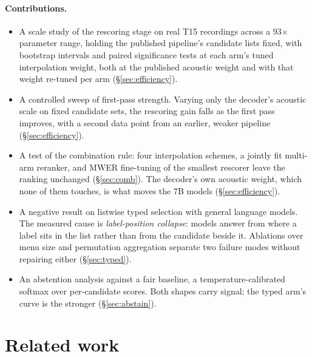 \documentclass[11pt]{article}
\begin{document}
\paragraph{Contributions.}
\begin{itemize}\itemsep2pt
\item A scale study of the rescoring stage on real T15 recordings across a 93$\times$
  parameter range, holding the published pipeline's candidate lists fixed, with bootstrap
  intervals and paired significance tests at each arm's tuned interpolation weight, both at
  the published acoustic weight and with that weight re-tuned per arm
  (\S\ref{sec:efficiency}).
\item A controlled sweep of first-pass strength. Varying only the decoder's acoustic
  scale on fixed candidate sets, the rescoring gain falls as the first pass improves, with
  a second data point from an earlier, weaker pipeline (\S\ref{sec:efficiency}).
\item A test of the combination rule: four interpolation schemes, a jointly fit multi-arm
  reranker, and MWER fine-tuning of the smallest rescorer leave the ranking unchanged
  (\S\ref{sec:comb}). The decoder's own acoustic weight, which none of them touches, is
  what moves the 7B models (\S\ref{sec:efficiency}).
\item A negative result on listwise typed selection with general language models. The measured cause is
  \emph{label-position collapse}: models answer from where a label sits in the list
  rather than from the candidate beside it. Ablations over menu size and permutation
  aggregation separate two failure modes without repairing either (\S\ref{sec:typed}).
\item An abstention analysis against a fair baseline, a temperature-calibrated softmax
  over per-candidate scores. Both shapes carry signal; the typed arm's curve is the
  stronger (\S\ref{sec:abstain}).
\end{itemize}

\section{Related work}
\label{sec:related}
\end{document}
